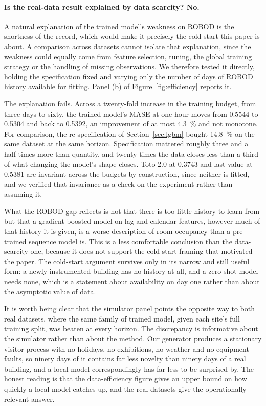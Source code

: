 \documentclass[utf8]{FrontiersinHarvard}
\newif\ifrevisionmarkup
\newcommand{\new}[1]{\ifrevisionmarkup\textcolor{revision}{#1}\else#1\fi}
\newif\ifsecondrevisionmarkup
\newcommand{\rev}[1]{\ifsecondrevisionmarkup\textcolor{revisiontwo}{#1}\else#1\fi}
\theoremstyle{plain}
\theoremstyle{definition}
\theoremstyle{remark}
\begin{document}
\new{\paragraph{Is the real-data result explained by data scarcity? No.} \rev{A natural explanation of the trained model's weakness on ROBOD is the shortness of the record, which would make it precisely the cold start this paper is about. A comparison across datasets cannot isolate that explanation, since the weakness could equally come from feature selection, tuning, the global training strategy or the handling of missing observations. We therefore tested it directly,} holding the specification fixed and varying only the number of days of ROBOD history available for fitting. Panel (b) of Figure~\ref{fig:efficiency} reports it.}

\new{The explanation fails. Across a twenty-fold increase in the training budget, from three days to sixty, the trained model's MASE at one hour moves from \num{0.5544} to \num{0.5304} and back to \num{0.5392}, an improvement of at most \SI{4.3}{\percent} and not monotone. For comparison, the re-specification of Section~\ref{sec:lgbm} bought \SI{14.8}{\percent} on the same dataset at the same horizon. Specification mattered roughly three and a half times more than quantity, and twenty times the data closes less than a third of what changing the model's shape closes. Toto-2.0 at \num{0.3743} and last value at \num{0.5381} are invariant across the budgets by construction, since neither is fitted, and we verified that invariance as a check on the experiment rather than assuming it.}

\new{ What the ROBOD gap reflects is not that there is too little history to learn from but that a gradient-boosted model on lag and calendar features, however much of that history it is given, is a worse description of room occupancy than a pre-trained sequence model is. \rev{This is a less comfortable conclusion than the data-scarcity one,} because it does not support the cold-start framing that motivated the paper. The cold-start argument survives only in its narrow and still useful form: a newly instrumented building has no history at all, and a zero-shot model needs none, which is a statement about availability on day one rather than about the asymptotic value of data.}

It is worth being clear that \new{the simulator panel} points the opposite way to both real datasets, where the same family of trained model, given each site's full training split, was beaten at every horizon. The discrepancy is informative about the simulator rather than about the method. Our generator produces a stationary visitor process with no holidays, no exhibitions, no weather and no equipment faults, so ninety days of it contains far less novelty than ninety days of a real building, and a local model correspondingly has far less to be surprised by. The honest reading is that the data-efficiency figure gives an upper bound on how quickly a local model catches up, and the real datasets give the operationally relevant answer.
\end{document}
